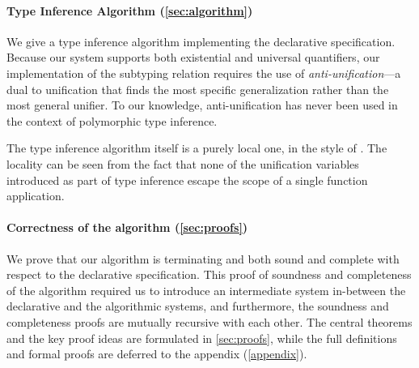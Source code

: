 \paragraph*{Type Inference Algorithm (\cref{sec:algorithm})} We give a type
  inference algorithm implementing the declarative specification. Because our
  system supports both existential and universal quantifiers, our implementation
  of the subtyping relation requires the use of \emph{anti-unification}---a dual
  to unification that finds the most specific generalization rather than the
  most general unifier. To our knowledge, anti-unification has never been used
  in the context of polymorphic type inference.

  The type inference algorithm itself is a purely local one, in the style of
  \citet{pierce2000:local}. The locality can be seen from the fact that 
  none of the unification variables introduced as part of type inference
  escape the scope of a single function application.

\paragraph*{Correctness of the algorithm (\cref{sec:proofs})}
  We prove that our algorithm is terminating and both sound and complete with
  respect to the declarative specification. This proof of soundness and completeness
  of the algorithm required us to introduce an intermediate system in-between
  the declarative and the algorithmic systems, and furthermore, the
  soundness and completeness proofs are mutually recursive with each other.
  The central theorems and the key proof ideas are formulated in \cref{sec:proofs}, 
  while the full definitions and formal proofs are deferred to the appendix (\cref{appendix}).

  

